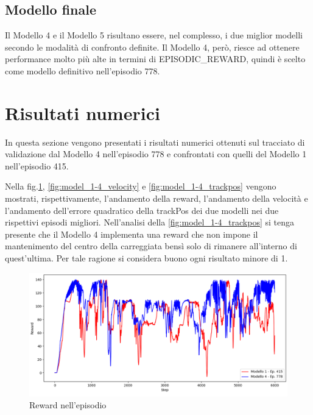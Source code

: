 \subsection{Modello finale}

Il Modello 4 e il Modello 5 risultano essere, nel complesso, i due miglior modelli secondo le modalità di confronto definite. Il Modello 4, però, riesce ad ottenere performance molto più alte in termini di EPISODIC\_REWARD, quindi è scelto come modello definitivo nell'episodio 778.
\newline

\clearpage

\section{Risultati numerici}

In questa sezione vengono presentati i risultati numerici ottenuti sul tracciato di validazione dal Modello 4 nell'episodio 778 e confrontati con quelli del Modello 1 nell'episodio 415.
\newline

Nella fig.\ref{fig:model_1-4_reward}, \ref{fig:model_1-4_velocity} e \ref{fig:model_1-4_trackpos} vengono mostrati, rispettivamente, l'andamento della reward, l'andamento della velocità e l'andamento dell'errore quadratico della trackPos dei due modelli nei due rispettivi episodi migliori. Nell'analisi della \ref{fig:model_1-4_trackpos} si tenga presente che il Modello 4 implementa una reward che non impone il mantenimento del centro della carreggiata bensì solo di rimanere all'interno di quest'ultima. Per tale ragione si considera buono ogni risultato minore di 1.

\begin{figure}[hb]
    \centering
    \includegraphics[width = 5.5in]{Figures/Chapter5/model_1-4_reward.png}
    \caption{Reward nell'episodio}
    \label{fig:model_1-4_reward}
\end{figure}

